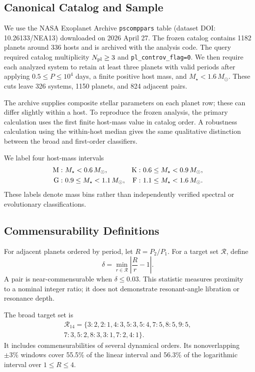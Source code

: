 \documentclass[twocolumn,linenumbers]{aastex631}
\begin{document}
\subsection{Canonical Catalog and Sample}

We use the NASA Exoplanet Archive \citep{christiansen2025}
\texttt{pscomppars} table (dataset DOI: 10.26133/NEA13) downloaded on
2026 April 27. The frozen catalog contains 1182 planets around 336 hosts and is
archived with the analysis code. The query required catalog multiplicity
$N_{\rm pl}\geq3$ and \texttt{pl\_controv\_flag=0}. We then require each
analyzed system to retain at least three planets with valid periods after
applying $0.5\leq P\leq10^4$ days, a finite positive host mass, and
$M_\star<1.6\,M_\odot$. These cuts leave 326 systems, 1150 planets, and 824
adjacent pairs.

The archive supplies composite stellar parameters on each planet row; these
can differ slightly within a host. To reproduce the frozen analysis, the
primary calculation uses the first finite host-mass value in catalog order.
A robustness calculation using the within-host median gives the same
qualitative distinction between the broad and first-order classifiers.

We label four host-mass intervals
\begin{align*}
{\rm M}:&\ M_\star<0.6\,M_\odot, &
{\rm K}:&\ 0.6\leq M_\star<0.9\,M_\odot,\\
{\rm G}:&\ 0.9\leq M_\star<1.1\,M_\odot, &
{\rm F}:&\ 1.1\leq M_\star<1.6\,M_\odot.
\end{align*}
These labels denote mass bins rather than independently verified spectral or
evolutionary classifications.

\subsection{Commensurability Definitions}

For adjacent planets ordered by period, let $R=P_2/P_1$. For a target set
$\mathcal{R}$, define
\begin{equation}
\delta=\min_{r\in\mathcal{R}}\left|\frac{R}{r}-1\right|.
\end{equation}
A pair is near-commensurable when $\delta\leq0.03$. This statistic measures
proximity to a nominal integer ratio; it does not demonstrate resonant-angle
libration or resonance depth.

The broad target set is
\begin{multline}
\mathcal{R}_{14}=\{3\!:\!2,2\!:\!1,4\!:\!3,5\!:\!3,5\!:\!4,7\!:\!5,
8\!:\!5,9\!:\!5,\\
7\!:\!3,5\!:\!2,8\!:\!3,3\!:\!1,7\!:\!2,4\!:\!1\}.
\end{multline}
It includes commensurabilities of several dynamical orders. Its nonoverlapping
$\pm3\%$ windows cover 55.5\% of the linear interval and 56.3\% of the
logarithmic interval over $1\leq R\leq4$.
\end{document}
